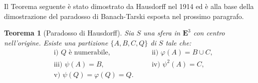 \documentclass[a4paper,oneside,11pt]{book}
\theoremstyle{definition} \newtheorem{Def}{Definizione}
\theoremstyle{plain} \newtheorem{teo}{Teorema}
\theoremstyle{plain} \newtheorem{cor}[teo]{Corollario}
\theoremstyle{definition} \newtheorem{lem}[teo]{Lemma}
\theoremstyle{plain} \newtheorem{pro}[teo]{Proposizione}
\begin{document}
	Il Teorema seguente è stato dimostrato da Hausdorff nel 1914 ed è alla base della dimostrazione del paradosso di Banach-Tarski esposta nel prossimo paragrafo.
	
	\begin{teo}[Paradosso di Hausdorff]\label{parhau} %
		Sia $S$ una sfera in $\mathbf{E}^3$ con centro nell'origine. Esiste una partizione $\{A, B, C, Q\}$ di $S$ tale che:
		\begin{equation*}
			\begin{aligned}
				&\text{i) } Q \text{ è numerabile} \text{,} &\quad &\text{ii) } \varphi(A) = B \cup C \text{,} \\
				&\text{iii) } \psi(A) = B  \text{,} &\quad &\text{iv) } \psi^2(A) = C \text{,} \\
				&\text{v) } \psi(Q) = \varphi(Q) = Q  \text{.} & \\
			\end{aligned}
		\end{equation*}
	\end{teo}
	
\end{document}
